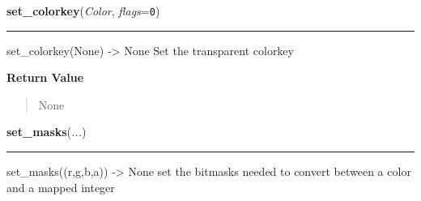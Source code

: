     \label{pygame:Surface:set_colorkey}

    \vspace{0.5ex}

\hspace{.8\funcindent}\begin{boxedminipage}{\funcwidth}

    \raggedright \textbf{set\_colorkey}(\textit{Color}, \textit{flags}={\tt 0})

    \vspace{-1.5ex}

    \rule{\textwidth}{0.5\fboxrule}
\setlength{\parskip}{2ex}
    set\_colorkey(None) -{\textgreater} None Set the transparent colorkey

\setlength{\parskip}{1ex}
      \textbf{Return Value}
    \vspace{-1ex}

      \begin{quote}
      None

      \end{quote}

    \end{boxedminipage}

    \label{pygame:Surface:set_masks}

    \vspace{0.5ex}

\hspace{.8\funcindent}\begin{boxedminipage}{\funcwidth}

    \raggedright \textbf{set\_masks}(\textit{...})

    \vspace{-1.5ex}

    \rule{\textwidth}{0.5\fboxrule}
\setlength{\parskip}{2ex}
    set\_masks((r,g,b,a)) -{\textgreater} None set the bitmasks needed to 
    convert between a color and a mapped integer

\setlength{\parskip}{1ex}
    \end{boxedminipage}

    \label{pygame:Surface:set_palette}

    \vspace{0.5ex}

